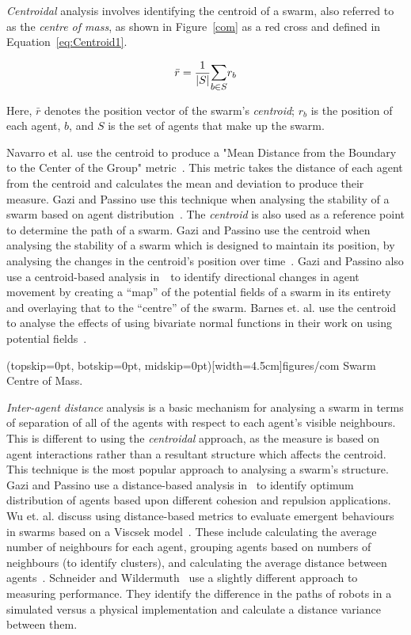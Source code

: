 \documentclass{ieeeaccess}
\newcommand{\card}[1]{\vert{#1}\vert}
\begin{document}
\textit{Centroidal} analysis involves identifying the centroid of a swarm, also
referred to as the \textit{centre of mass}, as shown in Figure~\ref{com} as a
red cross and defined in Equation~\ref{eq:Centroid1}. 

\begin{equation}\label{eq:Centroid1}
  \bar{r} = \frac{1}{\card{S}}\mathlarger{\sum_{b \in S}} r_b
\end{equation}

Here, $\bar{r}$ denotes the position vector of the swarm's \textit{centroid};
$r_b$ is the position of each agent, $b$, and $S$ is the set of agents that make
up the swarm.

Navarro et al. use the centroid to produce a "Mean Distance from the Boundary
to the Center of the Group" metric~\cite{NIM:09}. This metric takes the
distance of each agent from the centroid and calculates the mean and deviation
to produce their measure. Gazi and Passino use this technique when analysing
the stability of a swarm based on agent distribution~\cite{GP:11}. The
\textit{centroid} is also used as a reference point to determine the path of a
swarm. Gazi and Passino use the centroid when analysing the stability of a
swarm which is designed to maintain its position, by analysing the changes in
the centroid's position over time~\cite{GP:04}. Gazi and Passino also use a
centroid-based analysis in~\cite{GP:02}~to identify directional changes in
agent movement by creating a ``map'' of the potential fields of a swarm in its
entirety and overlaying that to the ``centre'' of the swarm.  Barnes et. al.
use the centroid to analyse the effects of using bivariate normal functions in
their work on using potential fields~\cite{BAF:06, BAFVM:06}. 

\Figure[t!](topskip=0pt, botskip=0pt, midskip=0pt)[width=4.5cm]{figures/com}
{Swarm Centre of Mass.\label{com}}

\textit{Inter-agent distance} analysis is a basic mechanism for analysing a
swarm in terms of separation of all of the agents with respect to each agent's
visible neighbours. This is different to using the \textit{centroidal} approach,
as the measure is based on agent interactions rather than a resultant structure
which affects the centroid. This technique is the most popular approach to
analysing a swarm's structure. Gazi and Passino use a distance-based analysis
in~\cite{GP:04, GP:11} to identify optimum distribution of agents based upon
different cohesion and repulsion applications. Wu et. al. discuss using
distance-based metrics to evaluate emergent behaviours in swarms based on a
Viscsek model~\cite{WCW:11}. These include calculating the average number of
neighbours for each agent, grouping agents based on numbers of neighbours (to
identify clusters), and calculating the average distance between agents~\cite{WCW:11}.
Schneider and Wildermuth~\cite{SW:03} use a slightly different approach to
measuring performance. They identify the difference in the paths of robots in a
simulated versus a physical implementation and calculate a distance variance
between them.
\end{document}
